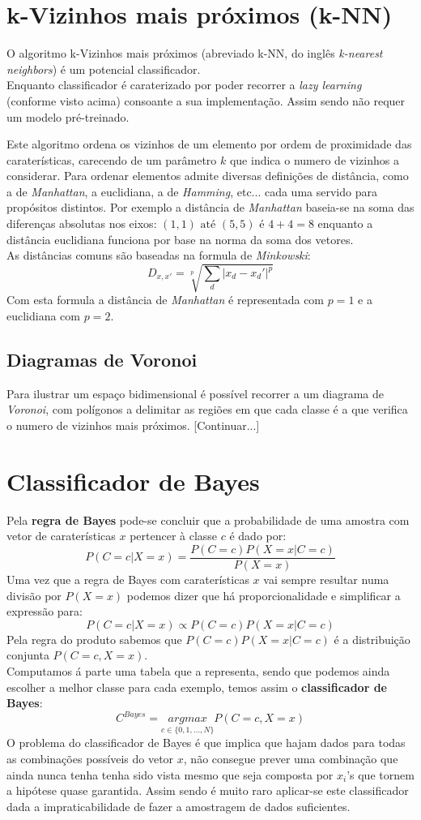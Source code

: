 \documentclass[]{report}
\begin{document}
\section{k-Vizinhos mais próximos (k-NN)}
O algoritmo k-Vizinhos mais próximos (abreviado k-NN, do inglês \textit{k-nearest neighbors}) é um potencial classificador.\\
Enquanto classificador é caraterizado por poder recorrer a \textit{lazy learning} (conforme visto acima) consoante a sua implementação. Assim sendo não requer um modelo pré-treinado.\par
Este algoritmo ordena os vizinhos de um elemento por ordem de proximidade das caraterísticas, carecendo de um parâmetro $k$ que indica o numero de vizinhos a considerar.
Para ordenar elementos admite diversas definições de distância, como a de \textit{Manhattan}, a euclidiana, a de \textit{Hamming}, etc... cada uma servido para propósitos distintos.
Por exemplo a distância de \textit{Manhattan} baseia-se na soma das diferenças absolutas nos eixos: $(1,1) \text{ até } (5,5) \text{ é } 4 + 4 = 8$ enquanto a distância euclidiana funciona por base na norma da soma dos vetores.\\
As distâncias comuns são baseadas na formula de \textit{Minkowski}:
$$ D_{x, x'} = \sqrt[p]{\sum_d |x_d - x_d'|^p} $$
Com esta formula a distância de \textit{Manhattan} é representada com $p=1$ e a euclidiana com $p=2$.\par
\subsection{Diagramas de Voronoi}
Para ilustrar um espaço bidimensional é possível recorrer a um diagrama de \textit{Voronoi}, com polígonos a delimitar as regiões em que cada classe é a que verifica o numero de vizinhos mais próximos. [Continuar...]
\section{Classificador de Bayes}
Pela \textbf{regra de Bayes} pode-se concluir que a probabilidade de uma amostra com vetor de caraterísticas $x$ pertencer à classe $c$ é dado por:
$$P(C=c|X=x)=\frac{P(C=c)P(X=x|C=c)}{P(X=x)}$$
Uma vez que a regra de Bayes com caraterísticas $x$ vai sempre resultar numa divisão por $P(X=x)$ podemos dizer que há proporcionalidade e simplificar a expressão para:
$$P(C=c|X=x)\propto P(C=c)P(X=x|C=c)$$
Pela regra do produto sabemos que $P(C=c)P(X=x|C=c)$ é a distribuição conjunta $P(C=c,X=x)$.\\
Computamos á parte uma tabela que a representa, sendo que podemos ainda escolher a melhor classe para cada exemplo, temos assim o \textbf{classificador de Bayes}:
$$C^{Bayes}=\underset{c\in \{0,1,\dots,N\}}{argmax} P(C=c,X=x)$$
O problema do classificador de Bayes é que implica que hajam dados para todas as combinações possíveis do vetor $x$, não consegue prever uma combinação que ainda nunca tenha tenha sido vista mesmo que seja composta por $x_i$'s que tornem a hipótese quase garantida.
Assim sendo é muito raro aplicar-se este classificador dada a impraticabilidade de fazer a amostragem de dados suficientes.
\end{document}
